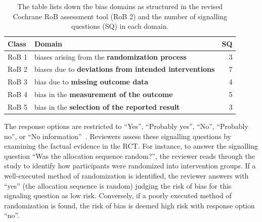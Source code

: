 \documentclass[sn-mathphys,Numbered]{sn-jnl}%
\theoremstyle{thmstyleone}%
\theoremstyle{thmstyletwo}%
\theoremstyle{thmstylethree}%
\begin{document}
%
%
%
\begin{table}
 \centering
   \caption{The table lists down the bias domains as structured in the revised Cochrane RoB assessment tool (RoB 2) and the number of signalling questions (SQ) in each domain.}\label{tab:robdomains}
    \begin{tabular}{llr}
    \toprule[1.0pt]
     Class & Domain & SQ\\
    \midrule[1.0pt]
    RoB 1 & biases arising from the \textbf{randomization process} &  3\\
    RoB 2 & biases due to \textbf{deviations from intended interventions} & 7\\
    RoB 3 & bias due to \textbf{missing outcome data} & 4\\
    RoB 4 & bias in the \textbf{measurement of the outcome} & 5\\
    RoB 5 & bias in the \textbf{selection of the reported result} & 3\\
    \bottomrule[1.0pt]
    \end{tabular}
\end{table}
%
%
%


The response options are restricted to ``Yes'', ``Probably yes'', ``No'', ``Probably no'', or ``No information''~\cite{sterne2019rob}.
Reviewers assess these signalling questions by examining the factual evidence in the RCT.
For instance, to answer the signalling question ``Was the allocation sequence random?'', the reviewer reads through the study to identify how participants were randomized into intervention groups.
If a well-executed method of randomization is identified, the reviewer answers with ``yes'' (the allocation sequence is random) judging the risk of bias for this signaling question as low risk.
Conversely, if a poorly executed method of randomization is found, the risk of bias is deemed  high risk with response option ``no''.
\end{document}
